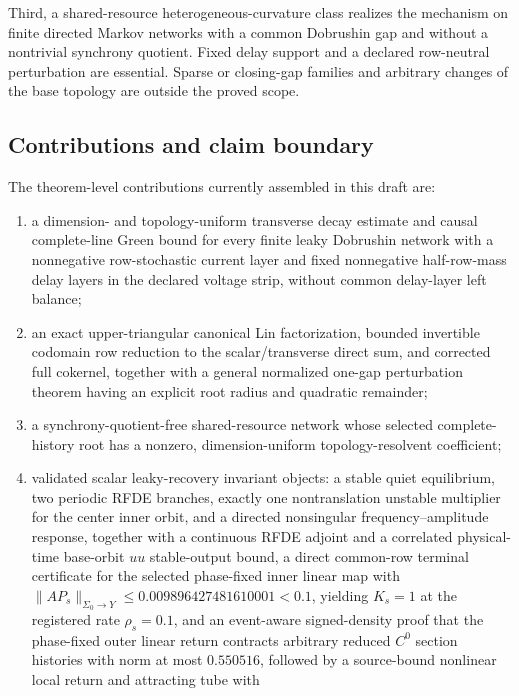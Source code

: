 Third, a shared-resource heterogeneous-curvature class realizes the
mechanism on finite directed Markov networks with a common Dobrushin gap and
without a nontrivial synchrony quotient.  Fixed delay support and a declared
row-neutral perturbation are essential.  Sparse or closing-gap families and
arbitrary changes of the base topology are outside the proved scope.

\subsection{Contributions and claim boundary}

The theorem-level contributions currently assembled in this draft are:

\begin{enumerate}[label=(\roman*)]
\item a dimension- and topology-uniform transverse decay estimate and causal
  complete-line Green bound for every finite leaky Dobrushin network with a
  nonnegative row-stochastic current layer and fixed nonnegative half-row-mass
  delay layers in the declared voltage strip, without common delay-layer
  left balance;
\item an exact upper-triangular canonical Lin factorization, bounded
  invertible codomain row reduction to the scalar/transverse direct sum, and
  corrected full cokernel, together with a general normalized one-gap
  perturbation theorem having an explicit root radius and quadratic remainder;
\item a synchrony-quotient-free shared-resource network whose selected
  complete-history root has a nonzero, dimension-uniform topology-resolvent
  coefficient;
\item validated scalar leaky-recovery invariant objects: a stable quiet
  equilibrium, two periodic RFDE branches, exactly one nontranslation
  unstable multiplier for the center inner orbit, and a directed nonsingular
  frequency--amplitude response, together with a continuous RFDE adjoint and
  a correlated physical-time base-orbit \(uu\) stable-output bound, a direct
  common-row terminal certificate for the selected phase-fixed inner linear
  map with \(\|AP_s\|_{\Sigma_0\to Y}\le0.009896427481610001<0.1\), yielding
  \(K_s=1\) at the registered rate \(\rho_s=0.1\), and an event-aware
  signed-density proof that the phase-fixed outer linear return contracts
  arbitrary reduced \(C^0\) section histories with norm at most \(0.550516\),
  followed by a source-bound nonlinear local return and attracting tube with

\end{enumerate}
